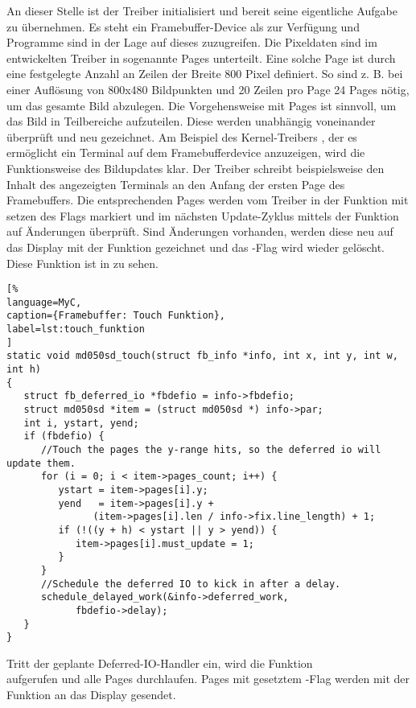 An dieser Stelle ist der Treiber initialisiert und bereit seine eigentliche Aufgabe zu übernehmen. Es steht ein Framebuffer-Device als  zur Verfügung und Programme sind in der Lage auf dieses zuzugreifen.
Die Pixeldaten sind im entwickelten Treiber in sogenannte Pages unterteilt. Eine solche Page ist durch eine festgelegte Anzahl an Zeilen der Breite 800 Pixel definiert. So sind z. B. bei einer Auflösung von 800x480 Bildpunkten und 20 Zeilen pro Page 24 Pages nötig, um das gesamte Bild abzulegen. Die Vorgehensweise mit Pages ist sinnvoll, um das Bild in Teilbereiche aufzuteilen. Diese werden unabhängig voneinander überprüft und neu gezeichnet. Am Beispiel des Kernel-Treibers , der es ermöglicht ein Terminal auf dem Framebufferdevice anzuzeigen, wird die Funktionsweise des Bildupdates klar. Der Treiber  schreibt beispielsweise den Inhalt des angezeigten Terminals an den Anfang der ersten Page des Framebuffers. Die entsprechenden Pages werden vom Treiber in der Funktion  mit setzen des Flags  markiert und im nächsten Update-Zyklus mittels der Funktion  auf Änderungen überprüft. Sind Änderungen vorhanden, werden diese neu auf das Display mit der Funktion  gezeichnet und das -Flag wird wieder gelöscht. Diese Funktion ist in
 zu sehen. 
\begin{lstlisting}[%
language=MyC,
caption={Framebuffer: Touch Funktion},
label=lst:touch_funktion
]
static void md050sd_touch(struct fb_info *info, int x, int y, int w, int h)
{
   struct fb_deferred_io *fbdefio = info->fbdefio;
   struct md050sd *item = (struct md050sd *) info->par;
   int i, ystart, yend;
   if (fbdefio) {
      //Touch the pages the y-range hits, so the deferred io will update them.
      for (i = 0; i < item->pages_count; i++) {
         ystart = item->pages[i].y;
         yend   = item->pages[i].y +
               (item->pages[i].len / info->fix.line_length) + 1;
         if (!((y + h) < ystart || y > yend)) {
            item->pages[i].must_update = 1;
         }
      }
      //Schedule the deferred IO to kick in after a delay.
      schedule_delayed_work(&info->deferred_work,
            fbdefio->delay);
   }
}
\end{lstlisting}
Tritt der geplante Deferred-IO-Handler ein, wird die Funktion \\aufgerufen und alle Pages durchlaufen. Pages mit gesetztem -Flag werden mit der Funktion  an das Display gesendet.
